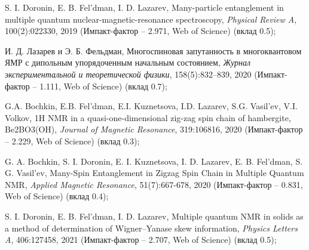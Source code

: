 \item
S. I. Doronin, E. B. Fel'dman,  I. D. Lazarev, Many-particle entanglement in multiple quantum nuclear-magnetic-resonance spectroscopy, \textit{Physical Review A}, 100(2):022330, 2019 (Импакт-фактор – 2.971, Web of Science) (вклад 0.5);


\item 
И. Д. Лазарев и Э. Б. Фельдман,
Многоспиновая запутанность в многоквантовом ЯМР с дипольным упорядоченным начальным состоянием,
\textit{Журнал экспериментальной и теоретической физики}, 158(5):832–839, 2020 (Импакт-фактор – 1.111, Web of Science) (вклад 0.7);

\item
G.A. Bochkin, E.B. Fel'dman, E.I. Kuznetsova, I.D. Lazarev, S.G. Vasil'ev, V.I. Volkov, 1H NMR in a quasi-one-dimensional zig-zag spin chain of hambergite, Be2BO3(OH), \textit{Journal of Magnetic Resonance}, 319:106816, 2020 (Импакт-фактор – 2.229, Web of Science) (вклад 0.3);

\item
G. A. Bochkin, S. I. Doronin, E. I. Kuznetsova, I. D. Lazarev, E. B. Fel'dman, S. G. Vasil'ev, Many-Spin Entanglement in Zigzag Spin Chain in Multiple Quantum NMR, \textit{Applied Magnetic Resonance}, 51(7):667-678, 2020 (Импакт-фактор – 0.831, Web of Science) (вклад 0.4);

\item
S. I. Doronin, E. B. Fel'dman,  I. D. Lazarev, Multiple quantum NMR in solids as a method of determination of Wigner–Yanase skew information, \textit{Physics Letters A}, 406:127458, 2021 (Импакт-фактор – 2.707, Web of Science) (вклад 0.5);
